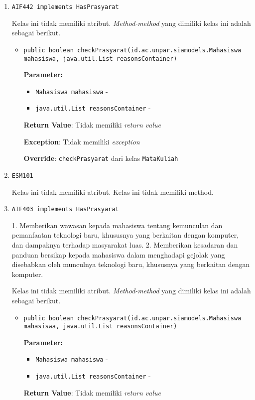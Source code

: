 \documentclass{article}
\begin{document}
\begin{enumerate}
\item \texttt{AIF442 implements HasPrasyarat}



Kelas ini tidak memiliki atribut. \textit{Method-method} yang dimiliki kelas ini adalah sebagai berikut.
\begin{itemize}
\item \texttt{public boolean checkPrasyarat(id.ac.unpar.siamodels.Mahasiswa mahasiswa, java.util.List reasonsContainer)}



\textbf{Parameter:}
\begin{itemize}
\item \texttt{Mahasiswa mahasiswa} - 
\item \texttt{java.util.List reasonsContainer} - 
\end{itemize}
\textbf{Return Value}: Tidak memiliki \textit{return value}

\textbf{Exception}: Tidak memiliki \textit{exception}

\textbf{Override}: \texttt{checkPrasyarat} dari kelas \texttt{MataKuliah}

\end{itemize}
\item \texttt{ESM101}



Kelas ini tidak memiliki atribut. Kelas ini tidak memiliki method. \item \texttt{AIF403 implements HasPrasyarat}

1. Memberikan wawasan kepada mahasiswa tentang kemunculan dan pemanfaatan teknologi baru, 
 khususnya yang berkaitan dengan komputer, dan dampaknya terhadap masyarakat luas.
 2. Memberikan kesadaran dan panduan bersikap kepada mahasiswa dalam menghadapi gejolak yang
 disebabkan oleh munculnya teknologi baru, khususnya yang berkaitan dengan komputer.

Kelas ini tidak memiliki atribut. \textit{Method-method} yang dimiliki kelas ini adalah sebagai berikut.
\begin{itemize}
\item \texttt{public boolean checkPrasyarat(id.ac.unpar.siamodels.Mahasiswa mahasiswa, java.util.List reasonsContainer)}



\textbf{Parameter:}
\begin{itemize}
\item \texttt{Mahasiswa mahasiswa} - 
\item \texttt{java.util.List reasonsContainer} - 
\end{itemize}
\textbf{Return Value}: Tidak memiliki \textit{return value}


\end{itemize}
\end{enumerate}
\end{document}
